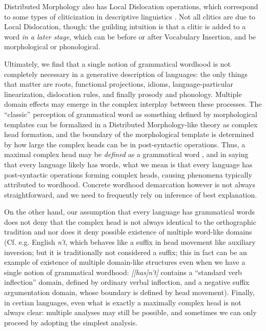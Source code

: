 \documentclass[UTF8, a4paper, oneside, scheme=plain, 12pt]{ctexrep}
\newcommand{\form}[1]{\emph{#1}}
\begin{document}
{Distributed Morphology also has Local Dislocation operations, which correspond to some types of cliticization in descriptive linguistics \citep{embick2007linearization}.
Not all clitics are due to Local Dislocation, though:
the guilding intuition is that a clitic is added to a word \emph{in a later stage},
which can be before or after Vocabulary Insertion, and be morphological or phonological.

Ultimately, we find that a single notion of grammatical wordhood is not completely necessary in a generative description of languages:
the only things that matter are roots, functional projections, idioms, language-particular  linearization, dislocation rules, and finally prosody and phonology. 
Multiple domain effects may emerge in the complex interplay between these processes.
The ``classic'' perception of grammatical word as something defined by morphological templates can be formalized in a Distributed Morphology-like theory as complex head formation, and the boundary of the morphological template is determined by how large the complex heads can be in post-syntactic operations.  
Thus, a maximal complex head may be \emph{defined} as a grammatical word \citep{embick2007linearization},
and in saying that every language likely has words, what we mean is that every language has post-syntactic operations forming complex heads, causing phenomena typically attributed to wordhood.
Concrete wordhood demarcation however is not always straightforward, and we need to frequently rely on inference of best explanation.

On the other hand, our assumption that every language has grammatical words does not deny that the complex head is not always identical to the orthographic tradition and nor does it deny possible existence of multiple word-like domains (Cf. e.g. English \form{n't}, which behaves like a suffix in head movement like auxiliary inversion; but it is traditionally not considered a suffix; this in fact can be an example of existence of multiple domain-like structures even when we have a single notion of grammatical wordhood: \form{[[has]n't]} contains a ``standard verb inflection'' domain, defined by ordinary verbal inflection, and a negative suffix argumentation domain, whose boundary is defined by head movement). Finally, in certian languages, even what is exactly a maximally complex head is not always clear: multiple analyses may still be possible, and sometimes we can only proceed by adopting the simplest analysis.

}
\end{document}
